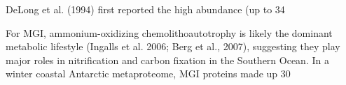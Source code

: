 
DeLong et al. (1994) first reported the high abundance (up to 34%

For MGI, ammonium-oxidizing chemolithoautotrophy is likely the dominant metabolic lifestyle (Ingalls et al. 2006; Berg et al., 2007), suggesting they play major roles in nitrification and carbon fixation in the Southern Ocean. In a winter coastal Antarctic metaproteome, MGI proteins made up 30%

